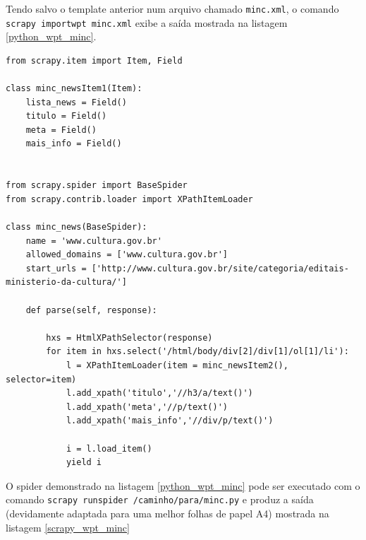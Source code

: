 Tendo salvo o template anterior num arquivo chamado \texttt{minc.xml}, o comando \texttt{scrapy importwpt minc.xml} exibe a saída mostrada na listagem \ref{python_wpt_minc}.

\pagebreak
{}
\begin{lstlisting}[label=python_wpt_minc]
from scrapy.item import Item, Field

class minc_newsItem1(Item):
    lista_news = Field()
    titulo = Field()
    meta = Field()
    mais_info = Field()


from scrapy.spider import BaseSpider
from scrapy.contrib.loader import XPathItemLoader

class minc_news(BaseSpider):
    name = 'www.cultura.gov.br'
    allowed_domains = ['www.cultura.gov.br']
    start_urls = ['http://www.cultura.gov.br/site/categoria/editais-ministerio-da-cultura/']

    def parse(self, response):
        
        hxs = HtmlXPathSelector(response)
        for item in hxs.select('/html/body/div[2]/div[1]/ol[1]/li'):
            l = XPathItemLoader(item = minc_newsItem2(), selector=item)
            l.add_xpath('titulo','//h3/a/text()')
            l.add_xpath('meta','//p/text()')
            l.add_xpath('mais_info','//div/p/text()')

            i = l.load_item()
            yield i

\end{lstlisting}


O spider demonstrado na listagem \ref{python_wpt_minc} pode ser executado com o comando \texttt{scrapy runspider /caminho/para/minc.py} e produz a saída (devidamente adaptada para uma melhor folhas de papel A4) mostrada na listagem \ref{scrapy_wpt_minc}

